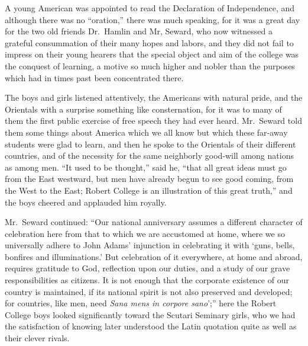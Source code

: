 \documentclass[12pt]{book}
\begin{document}
A young American was appointed to read the Declaration of Independence,
and although there was no “oration,” there was much speaking, for it was a great
day for the two old friends Dr.~Hamlin and Mr, Seward, who now witnessed a
grateful consummation of their many hopes and labors, and they did not fail to
impress on their young hearers that the special object and aim of the college was
the conquest of learning, a motive so much higher and nobler than the purposes
which had in times past been concentrated there.

The boys and girls listened attentively, the Americans with natural pride, and
the Orientals with a surprise something like consternation, for it was to many of
them the first public exercise of free speech they had ever heard. Mr.~Seward told
them some things about America which we all know but which these far‐away
students were glad to learn, and then he spoke to the Orientals of their different
countries, and of the necessity for the same neighborly good‐will among nations
as among men. “It used to be thought,” said he, “that all great ideas must go from
the East westward, but men have already begun to see good coming, from the
West to the East; Robert College is an illustration of this great truth,” and the boys
cheered and applauded him royally.

Mr.~Seward continued: “Our national anniversary assumes a different character of celebration here from that to which we are accustomed at home, where we
so universally adhere to John Adams’ injunction in celebrating it with ‘guns, bells,
bonfires and illuminations.’ But celebration of it everywhere, at home and abroad,
requires gratitude to God, reflection upon our duties, and a study of our grave
responsibilities as citizens. It is not enough that the corporate existence of our
country is maintained, if its national spirit is not also preserved and developed;
for countries, like men, need {\it Sana mens in corpore sano}’;” here the Robert College
boys looked significantly toward the Scutari Seminary girls, who we had the
satisfaction of knowing later understood the Latin quotation quite as well as their
clever rivals.
\end{document}
